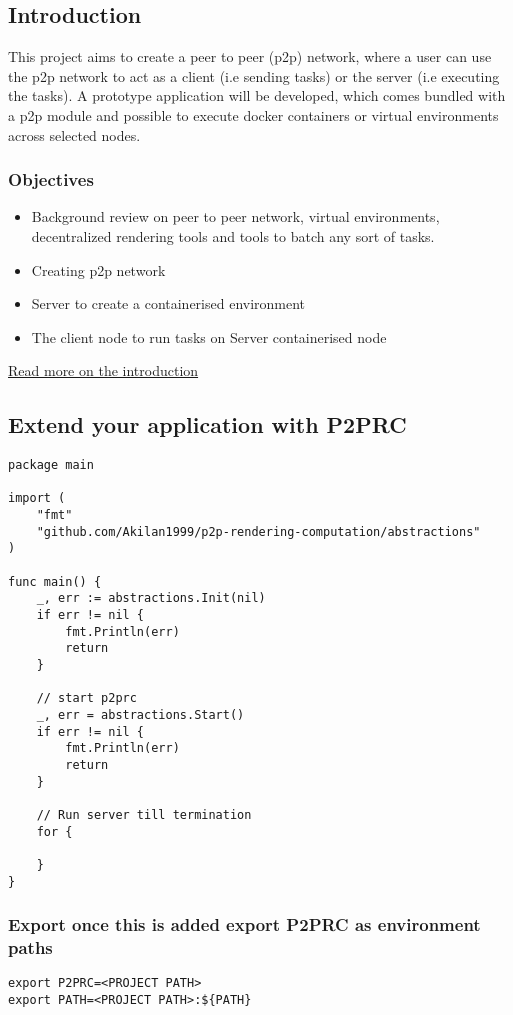 \documentclass[11pt]{article}
\begin{document}
\subsection{Introduction}
\label{sec:org00598fd}
This project aims to create a peer to peer (p2p) network, where a user
can use the p2p network to act as a client (i.e sending tasks) or the
server (i.e executing the tasks). A prototype application will be
developed, which comes bundled with a p2p module and possible to execute
docker containers or virtual environments across selected nodes.

\subsubsection{Objectives}
\label{sec:org385b937}
\begin{itemize}
\item Background review on peer to peer network, virtual environments,
decentralized rendering tools and tools to batch any sort of tasks.
\item Creating p2p network
\item Server to create a containerised environment
\item The client node to run tasks on Server containerised node
\end{itemize}

\href{Docs/Introduction.md}{Read more on the introduction}

\subsection{Extend your application with P2PRC}
\label{sec:orgcab50f2}
\begin{verbatim}
package main

import (
    "fmt"
    "github.com/Akilan1999/p2p-rendering-computation/abstractions"
)

func main() {
    _, err := abstractions.Init(nil)
    if err != nil {
        fmt.Println(err)
        return
    }

    // start p2prc
    _, err = abstractions.Start()
    if err != nil {
        fmt.Println(err)
        return
    }

    // Run server till termination
    for {

    }
}
\end{verbatim}

\subsubsection{Export once this is added export P2PRC as environment paths}
\label{sec:orgd4e7f7c}
\begin{verbatim}
export P2PRC=<PROJECT PATH>
export PATH=<PROJECT PATH>:${PATH}
\end{verbatim}
\end{document}
